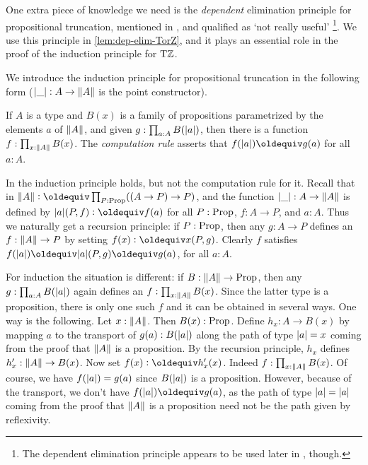 \documentclass[a4paper,12pt]{amsart}
\begin{document}
One extra piece of knowledge we need is the \emph{dependent} elimination
principle for propositional truncation, mentioned in \cite[6.9]{hottbook},
and qualified as `not really useful'%
\footnote{The dependent elimination principle appears to
  be used later in \cite[Lemma 7.3.3]{hottbook}, though.
}.
We use this principle in \cref{lem:dep-elim-TorZ}, and it plays an
essential role in the proof of the induction principle for ${\mathrm{T}\mathbb{Z}}$.

We introduce the induction principle for propositional truncation in the following form
($\lvert\_\rvert: A\to\lVert A\rVert$ is the point constructor).

\begin{definition}\label{def:proptruncind}
  If $A$ is a type and $B(x)$ is a family of propositions parametrized by the elements $a$ of $\lVert A\rVert$,
  and given $g : \prod_{a:A} B(\lvert a\rvert)$, then there is a function $f : \prod_{x:\lVert A\rVert} B(x)$.
  The \emph{computation rule} asserts that $f (\trunc a) \jdeq g(a)$ for all $a:A$.
\end{definition}

In {\UniMath} the induction principle holds, but not the computation rule for it.
Recall that in {\UniMath} $\Trunc A \defeq \prod_{P:\Prop}((A \to P) \to P)$, and
the function $\lvert\_\rvert: A\to\lVert A\rVert$ is
defined by $\trunc a  (P,f) \defeq f(a)$ for all $P: \mathord{\mathrm{Prop}}$, $f: A\to P$, and $a:A$.
Thus we naturally get a recursion principle: if $P: \mathord{\mathrm{Prop}}$, then any
$g: A \to P$ defines an $f : \lVert A\rVert \to P$ by setting $f(x)\defeq x(P,g)$.
Clearly $f$ satisfies $f(\trunc a) \jdeq \trunc a (P,g) \jdeq g(a)$, for all $a:A$.

For induction the situation is different: if $B: \lVert A\rVert \to \mathord{\mathrm{Prop}}$,
then any $g: \prod_{a:A} B(\lvert a\rvert)$ again defines an
$f:  \prod_{x:\lVert A\rVert} B(x)$. Since the latter type is a proposition,
there is only one such $f$ and it can be obtained in several ways.
One way is the following. Let $x: \lVert A\rVert$. Then $B(x): \mathord{\mathrm{Prop}}$.
Define $h_x: A \to B(x)$ by mapping $a$ to the transport of $g(a): B(\lvert a\rvert)$
along the path of type $\lvert a\rvert = x$ coming from the proof that $\lVert A\rVert$ is a proposition.
By the recursion principle, $h_x$ defines $h'_x : \lVert A\rVert \to B(x)$.
Now set $f(x) \defeq h'_x(x)$. Indeed $f: \prod_{x:\lVert A\rVert} B(x)$.
Of course, we have $f(\lvert a\rvert) = g(a)$ since $B(\lvert a\rvert)$ is a proposition.
However, because of the transport, we don't have $f(\trunc a) \jdeq g(a)$,
as the path of type $\lvert a\rvert = \lvert a\rvert$ coming from the proof that $\lVert A\rVert$ is
a proposition need not be the path given by reflexivity.
\end{document}

